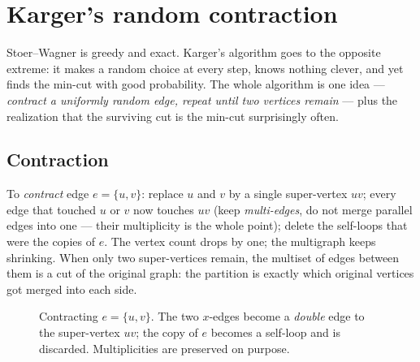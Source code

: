 \section{Karger's random contraction}

Stoer--Wagner is greedy and exact. Karger's algorithm goes to the opposite extreme: it makes a random choice at every step, knows nothing clever, and yet finds the min-cut with good probability. The whole algorithm is one idea --- \emph{contract a uniformly random edge, repeat until two vertices remain} --- plus the realization that the surviving cut is the min-cut surprisingly often.

\subsection{Contraction}

To \emph{contract} edge $e=\{u,v\}$: replace $u$ and $v$ by a single super-vertex $uv$; every edge that touched $u$ or $v$ now touches $uv$ (keep \emph{multi-edges}, do not merge parallel edges into one --- their multiplicity is the whole point); delete the self-loops that were the copies of $e$. The vertex count drops by one; the multigraph keeps shrinking. When only two super-vertices remain, the multiset of edges between them is a cut of the original graph: the partition is exactly which original vertices got merged into each side.

\begin{figure}[H]
\centering
{}
\caption{Contracting $e=\{u,v\}$. The two $x$-edges become a \emph{double} edge to the super-vertex $uv$; the copy of $e$ becomes a self-loop and is discarded. Multiplicities are preserved on purpose.}
\label{ch11:fig-contract}
\end{figure}

